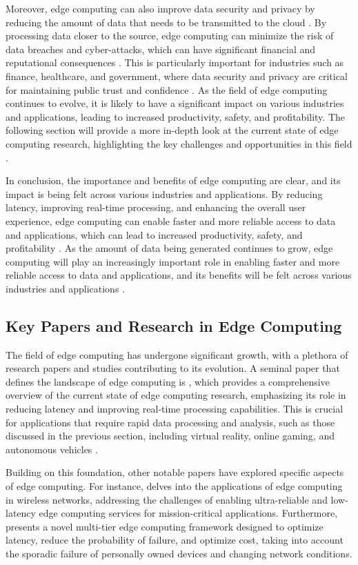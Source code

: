 \documentclass[11pt]{article}
\begin{document}
Moreover, edge computing can also improve data security and privacy by reducing the amount of data that needs to be transmitted to the cloud \cite{ref16}. By processing data closer to the source, edge computing can minimize the risk of data breaches and cyber-attacks, which can have significant financial and reputational consequences \cite{ref17}. This is particularly important for industries such as finance, healthcare, and government, where data security and privacy are critical for maintaining public trust and confidence \cite{ref18}. As the field of edge computing continues to evolve, it is likely to have a significant impact on various industries and applications, leading to increased productivity, safety, and profitability. The following section will provide a more in-depth look at the current state of edge computing research, highlighting the key challenges and opportunities in this field \cite{ref2}.

In conclusion, the importance and benefits of edge computing are clear, and its impact is being felt across various industries and applications. By reducing latency, improving real-time processing, and enhancing the overall user experience, edge computing can enable faster and more reliable access to data and applications, which can lead to increased productivity, safety, and profitability \cite{ref2}. As the amount of data being generated continues to grow, edge computing will play an increasingly important role in enabling faster and more reliable access to data and applications, and its benefits will be felt across various industries and applications \cite{ref1}.

\subsection{Key Papers and Research in Edge Computing}

The field of edge computing has undergone significant growth, with a plethora of research papers and studies contributing to its evolution. A seminal paper that defines the landscape of edge computing is \cite{ref2}, which provides a comprehensive overview of the current state of edge computing research, emphasizing its role in reducing latency and improving real-time processing capabilities. This is crucial for applications that require rapid data processing and analysis, such as those discussed in the previous section, including virtual reality, online gaming, and autonomous vehicles \cite{ref9}.

Building on this foundation, other notable papers have explored specific aspects of edge computing. For instance, \cite{ref19} delves into the applications of edge computing in wireless networks, addressing the challenges of enabling ultra-reliable and low-latency edge computing services for mission-critical applications. Furthermore, \cite{ref20} presents a novel multi-tier edge computing framework designed to optimize latency, reduce the probability of failure, and optimize cost, taking into account the sporadic failure of personally owned devices and changing network conditions.
\end{document}
